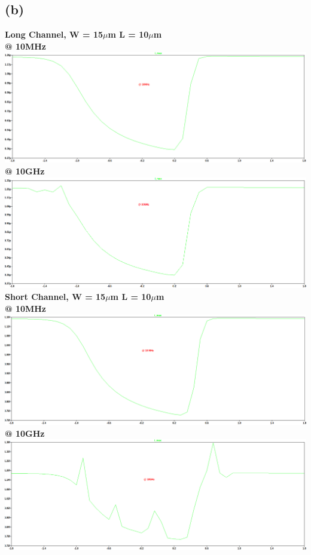 \documentclass{article}
\begin{document}
\subsection*{(b)}
\textbf{Long Channel, W = 15$\mu$m L = 10$\mu$m}\\
\textbf{@ 10MHz}\\
\includegraphics[scale=0.33]{./figs/Q2_nmos_lc_10M.png}\\
 \newline
\textbf{@ 10GHz}\\
\includegraphics[scale=0.33]{./figs/Q2_nmos_lc_10G.png}\\
 \newline
\textbf{Short Channel, W = 15$\mu$m L = 10$\mu$m}\\
\textbf{@ 10MHz}\\
\includegraphics[scale=0.33]{./figs/Q2_nmos_sc_10M.png}\\
 \newline
\textbf{@ 10GHz}\\
\includegraphics[scale=0.33]{./figs/Q2_nmos_sc_10G.png}\\
\end{document}
